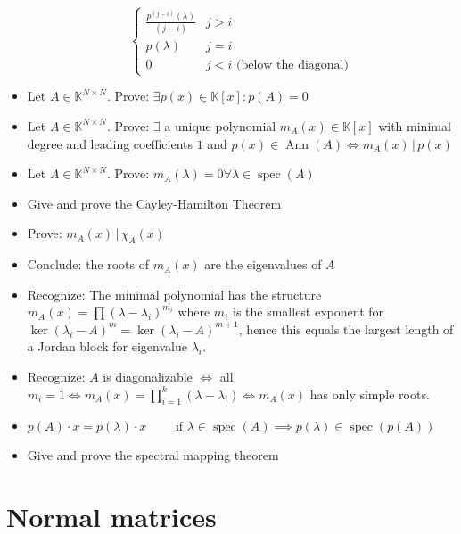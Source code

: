 \documentclass[a4paper]{article}
\newcommand{\divides}{\,\big|\,} %
\begin{document}
\begin{itemize}
\[\begin{cases}
        \frac{p^{(j - i)}(\lambda)}{(j - i)} & j > i \\
        p(\lambda) & j = i \\
        0 & j < i \text{ (below the diagonal)}
      \end{cases}
    \]
  \item Let $A \in \mathbb K^{N \times N}$. Prove: $\exists p(x) \in \mathbb K[x]: p(A) = 0$
  \item Let $A \in \mathbb K^{N \times N}$. Prove: $\exists$ a unique polynomial $m_A(x) \in \mathbb K[x]$ with minimal degree and leading coefficients $1$ and $p(x) \in \operatorname{Ann}(A) \iff m_A(x) \divides{} p(x)$
  \item Let $A \in \mathbb K^{N \times N}$. Prove: $m_A(\lambda) = 0 \forall \lambda \in \operatorname{spec}(A)$
  \item Give and prove the Cayley-Hamilton Theorem
  \item Prove: $m_A(x) \divides{} \chi_A(x)$
  \item Conclude: the roots of $m_A(x)$ are the eigenvalues of $A$
  \item Recognize: The minimal polynomial has the structure $m_A(x) = \prod (\lambda - \lambda_i)^{m_i}$ where $m_i$ is the smallest exponent for $\ker(\lambda_i - A)^m = \ker(\lambda_i - A)^{m+1}$, hence this equals the largest length of a Jordan block for eigenvalue $\lambda_i$.
  \item Recognize: $A$ is diagonalizable $\iff$ all $m_i = 1 \iff m_A(x) = \prod_{i=1}^k (\lambda - \lambda_i) \iff m_A(x)$ has only simple roots.
  \item $p(A) \cdot x = p(\lambda) \cdot x \qquad \text{ if } \lambda \in \operatorname{spec}(A) \implies p(\lambda) \in \operatorname{spec}(p(A))$
  \item Give and prove the spectral mapping theorem
\end{itemize}

\section{Normal matrices}
\end{document}
